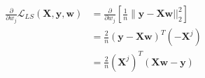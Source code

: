 \newcommand{\matrix}[1]{\mathbf{#1}}
\newcommand{\vector}[1]{\mathbf{#1}}
\newcommand{\X}{\matrix{X}}
\newcommand{\y}{\vector{y}}
\newcommand{\w}{\vector{w}}
\begin{align*}
\frac{\partial}{\partial w_j} \mathcal{L}_{LS}(\X,\y,\w) &= \frac{\partial}{\partial w_j} \left[ \frac{1}{n} \|\y - \X\w||_2^2 \right] \\
&= \frac{2}{n} (\y - \X\w)^T (-\X^j) \\
&= \frac{2}{n} (\X^j)^T (\X\w - \y) \\
\end{align*}
